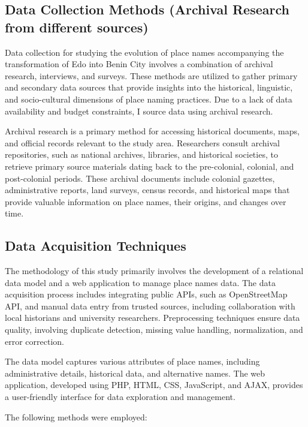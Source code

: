 \subsection{Data Collection Methods (Archival Research from different sources)}

Data collection for studying the evolution of place names accompanying the transformation of Edo into Benin City involves a combination of archival research, interviews, and surveys. These methods are utilized to gather primary and secondary data sources that provide insights into the historical, linguistic, and socio-cultural dimensions of place naming practices. Due to a lack of data availability and budget constraints, I source data using archival research.

Archival research is a primary method for accessing historical documents, maps, and official records relevant to the study area. Researchers consult archival repositories, such as national archives, libraries, and historical societies, to retrieve primary source materials dating back to the pre-colonial, colonial, and post-colonial periods. These archival documents include colonial gazettes, administrative reports, land surveys, census records, and historical maps that provide valuable information on place names, their origins, and changes over time.


\subsection{Data Acquisition Techniques}

The methodology of this study primarily involves the development of a relational data model and a web application to manage place names data. The data acquisition process includes integrating public APIs, such as OpenStreetMap API, and manual data entry from trusted sources, including collaboration with local historians and university researchers. Preprocessing techniques ensure data quality, involving duplicate detection, missing value handling, normalization, and error correction.

The data model captures various attributes of place names, including administrative details, historical data, and alternative names. The web application, developed using PHP, HTML, CSS, JavaScript, and AJAX, provides a user-friendly interface for data exploration and management.

The following methods were employed:

